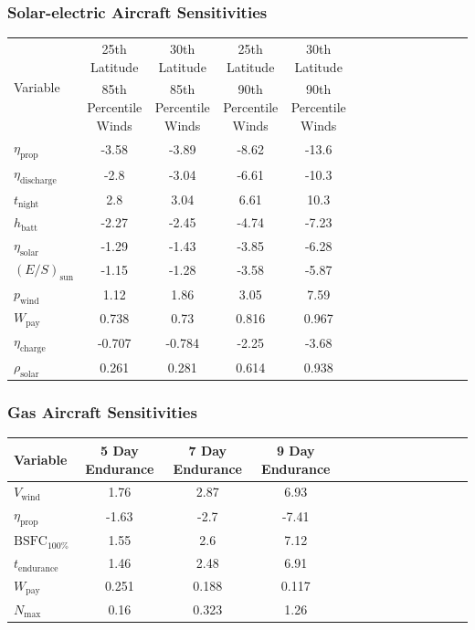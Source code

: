 \documentclass{beamer}
\begin{document}
\begin{frame}
    \frametitle{Solar-electric Aircraft Sensitivities}

    \tiny
    \begin{longtable}{lccccccccccccc}
        \toprule
        \toprule
        \multirow{2}{*}{Variable}& 25th Latitude & 30th Latitude & 25th Latitude & 30th Latitude \\
                                 & 85th Percentile Winds & 85th Percentile Winds & 90th Percentile Winds & 90th Percentile Winds \\
        \midrule
        $\eta_{\text{prop}}$ &-3.58 & -3.89 & -8.62 & -13.6\\
        $\eta_{\text{discharge}}$ &-2.8 & -3.04 & -6.61 & -10.3\\
        $t_{\text{night}}$ &2.8 & 3.04 & 6.61 & 10.3\\
        $h_{\text{batt}}$ &-2.27 & -2.45 & -4.74 & -7.23\\
        $\eta_{\text{solar}}$ &-1.29 & -1.43 & -3.85 & -6.28\\
        $(E/S)_{\text{sun}}$ &-1.15 & -1.28 & -3.58 & -5.87\\
        $p_{\text{wind}}$ &1.12 & 1.86 & 3.05 & 7.59\\
        $W_{\text{pay}}$ &0.738 & 0.73 & 0.816 & 0.967\\
        $\eta_{\text{charge}}$ &-0.707 & -0.784 & -2.25 & -3.68\\
        $\rho_{\text{solar}}$ &0.261 & 0.281 & 0.614 & 0.938\\
        \bottomrule
    \end{longtable}

\end{frame}

\begin{frame}
    \frametitle{Gas Aircraft Sensitivities}

    \scriptsize
    \begin{longtable}{lccccccccccccc}
        \toprule
        \toprule
        Variable & 5 Day Endurance & 7 Day Endurance & 9 Day Endurance\\
        \midrule
        $V_{\text{wind}}$ &1.76 & 2.87 & 6.93\\
        $\eta_{\text{prop}}$ &-1.63 & -2.7 & -7.41\\
        $\text{BSFC}_{100\%}$ &1.55 & 2.6 & 7.12\\
            $t_{\text{endurance}}$ &1.46 & 2.48 & 6.91\\
        $W_{\text{pay}}$ &0.251 & 0.188 & 0.117\\
        $N_{\text{max}}$ &0.16 & 0.323 & 1.26\\
        \bottomrule
        \end{longtable}
    
\end{frame}
\end{document}
